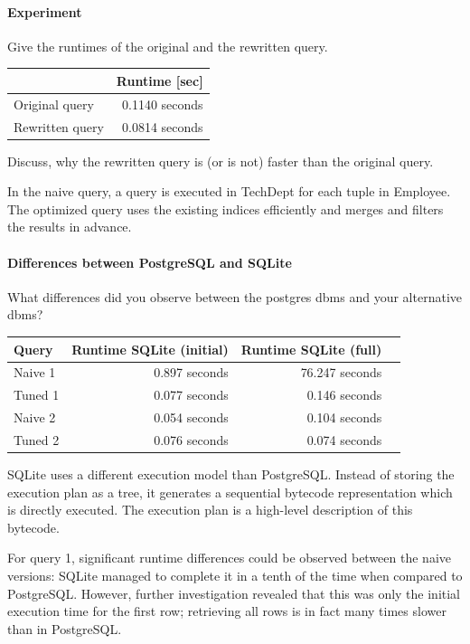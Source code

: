 \documentclass[11pt]{scrartcl}
\begin{document}
\paragraph{Experiment}

Give the runtimes of the original and the rewritten query.

\begin{table}[H]
  \centering
  \begin{tabular}{l|r}
    & Runtime [sec] \tabularnewline
    \hline
    Original query  & 0.1140 seconds \tabularnewline
    Rewritten query & 0.0814 seconds \tabularnewline
  \end{tabular}
\end{table}

Discuss, why the rewritten query is (or is not) faster than the original query.

In the naive query, a query is executed in TechDept for each tuple in Employee. The optimized query uses the existing indices efficiently and merges and filters the results in advance.

\paragraph{Differences between PostgreSQL and SQLite}

What differences did you observe between the postgres dbms and your alternative dbms?

\begin{table}[H]
  \centering
  \begin{tabular}{l|r|r|r}
    Query & Runtime SQLite (initial) & Runtime SQLite (full) \tabularnewline
    \hline
    Naive 1 & 0.897 seconds & 76.247 seconds \tabularnewline
    Tuned 1 & 0.077 seconds & 0.146 seconds \tabularnewline
    Naive 2 & 0.054 seconds & 0.104 seconds \tabularnewline
    Tuned 2 & 0.076 seconds & 0.074 seconds \tabularnewline
  \end{tabular}
\end{table}

SQLite uses a different execution model than PostgreSQL.  Instead of storing the execution plan as a tree, it generates a sequential bytecode representation which is directly executed.  The execution plan is a high-level description of this bytecode.

For query 1, significant runtime differences could be observed between the naive versions: SQLite managed to complete it in a tenth of the time when compared to PostgreSQL. However, further investigation revealed that this was only the initial execution time for the first row; retrieving all rows is in fact many times slower than in PostgreSQL.
\end{document}

